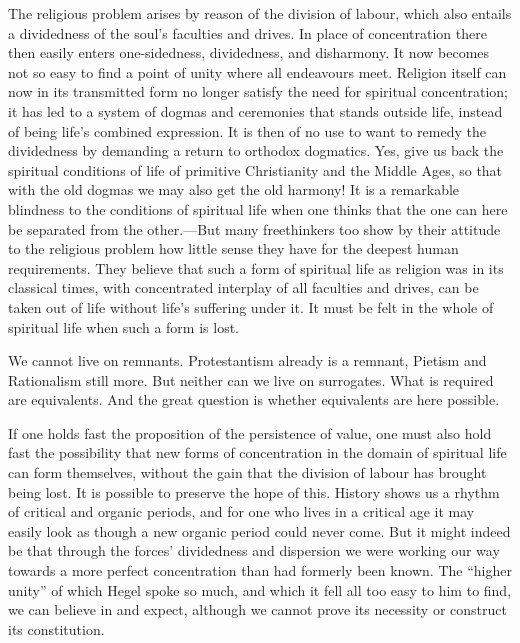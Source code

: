 \documentclass[12pt,a4paper]{book}
\newcommand{\opage}[1]{\marginnote{\footnotesize\textit{[#1]}}}
\begin{document}
The religious problem arises by reason of the division of labour, which also entails a dividedness of the soul's
faculties and drives. In place of concentration there then easily enters one-sidedness, dividedness, and
disharmony. It now becomes not so easy to find a 
\opage{224}point of unity where all endeavours meet. Religion itself can
now in its transmitted form no longer satisfy the need for spiritual concentration; it has led to a system of
dogmas and ceremonies that stands outside life, instead of being life's combined expression. It is then of no
use to want to remedy the dividedness by demanding a return to orthodox dogmatics. Yes, give us back the
spiritual conditions of life of primitive Christianity and the Middle Ages, so that with the old dogmas we may
also get the old harmony! It is a remarkable blindness to the conditions of spiritual life when one thinks that
the one can here be separated from the other.---But many freethinkers too show by their attitude to the religious
problem how little sense they have for the deepest human requirements. They believe that such a form of spiritual
life as religion was in its classical times, with concentrated interplay of all faculties and drives, can be
taken out of life without life's suffering under it. It must be felt in the whole of spiritual life when such a
form is lost.

We cannot live on remnants. Protestantism already is a remnant, Pietism and Rationalism still more. But neither
can we live on surrogates. What is required are equivalents. And the great question is whether equivalents are
here possible.

If one holds fast the proposition of the persistence of value, one must also hold fast the possibility that new
forms of concentration in the domain of spiritual life can form themselves, without the gain that the division of
labour has brought being lost. It is possible to preserve the hope of this. History shows us a rhythm of critical
and organic periods, and for one who lives in a critical age it may easily look as though a new organic period
could never come. But it might indeed be that through the forces' dividedness and dispersion we were working our
way towards a more perfect concentration than had formerly been known. The ``higher unity'' of which Hegel spoke
so much, and which it fell all too easy to him to find, we can believe in and expect, although we cannot prove its
necessity or construct its constitution.

\medskip
\end{document}
